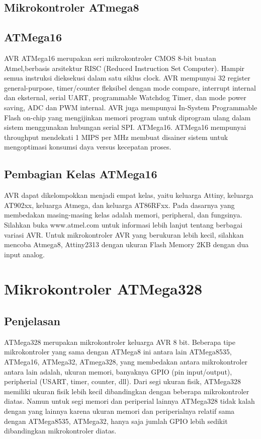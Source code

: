 	\subsection{Mikrokontroler ATmega8}
		
	\subsection{ATMega16}
		AVR ATMega16 merupakan seri mikrokontroler CMOS 8-bit buatan Atmel,berbasis arsitektur RISC (Reduced Instruction Set Computer). Hampir semua instruksi dieksekusi dalam satu siklus clock. AVR mempunyai 32 register general-purpose, timer/counter fleksibel dengan mode compare, interrupt internal dan eksternal, serial UART, programmable Watchdog Timer, dan mode power saving, ADC dan PWM internal. AVR juga mempunyai In-System Programmable Flash on-chip yang mengijinkan memori program untuk diprogram ulang dalam sistem menggunakan hubungan serial SPI. ATMega16. ATMega16 mempunyai throughput mendekati 1 MIPS per MHz membuat disainer sistem untuk mengoptimasi konsumsi daya versus kecepatan proses.
	\subsection{Pembagian Kelas ATMega16}
		AVR dapat dikelompokkan menjadi empat kelas, yaitu keluarga Attiny, keluarga AT902xx, keluarga Atmega, dan keluarga AT86RFxx. Pada dasarnya yang membedakan masing-masing kelas adalah memori, peripheral, dan fungsinya. Silahkan buka www.atmel.com untuk informasi lebih lanjut tentang berbagai variasi AVR. Untuk mikrokontroler AVR yang berukuran lebih kecil, silahkan mencoba Atmega8, Attiny2313 dengan ukuran Flash Memory 2KB dengan dua input analog.

\section{Mikrokontroler ATMega328}
	\subsection{Penjelasan}
	ATMega328 merupakan mikrokontroler keluarga AVR 8 bit. Beberapa tipe mikrokontroler yang sama dengan ATMega8 ini antara lain ATMega8535, ATMega16, ATMega32, ATmega328, yang membedakan antara mikrokontroler antara lain adalah, ukuran memori, banyaknya GPIO (pin input/output), peripherial (USART, timer, counter, dll). Dari segi ukuran fisik, ATMega328 memiliki ukuran fisik lebih kecil dibandingkan dengan beberapa mikrokontroler diatas. Namun untuk segi memori dan periperial lainnya ATMega328 tidak kalah dengan yang lainnya karena ukuran memori dan periperialnya relatif sama dengan ATMega8535, ATMega32, hanya saja jumlah GPIO lebih sedikit dibandingkan mikrokontroler diatas.

